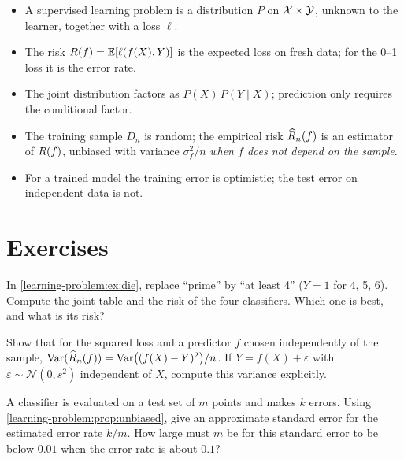 \begin{notechapter}
\begin{chaptersummary}
\begin{itemize}[nosep]
  \item A supervised learning problem is a distribution $P$ on
        $\mathcal{X}\times\mathcal{Y}$, unknown to the learner, together with a loss $\ell$.
  \item The risk $R(f) = \mathbb{E}[\ell(f(X),Y)]$ is the expected loss on fresh
        data; for the 0--1 loss it is the error rate.
  \item The joint distribution factors as $P(X)\,P(Y\mid X)$; prediction only
        requires the conditional factor.
  \item The training sample $D_n$ is random; the empirical risk $\widehat{R}_n(f)$ is
        an estimator of $R(f)$, unbiased with variance $\sigma_f^2/n$
        \emph{when $f$ does not depend on the sample}.
  \item For a trained model the training error is optimistic; the test error
        on independent data is not.
\end{itemize}
\end{chaptersummary}

\section*{Exercises}

\begin{exercise}\label{learning-problem:exr:1}
In \cref{learning-problem:ex:die}, replace ``prime'' by ``at least 4''
($Y=1$ for 4, 5, 6). Compute the joint table and the risk of the four
classifiers. Which one is best, and what is its risk?
\end{exercise}

\begin{exercise}\label{learning-problem:exr:2}
Show that for the squared loss and a predictor $f$ chosen independently of
the sample, $\operatorname{Var}(\widehat{R}_n(f)) = \operatorname{Var}\bigl((f(X)-Y)^2\bigr)/n$. If
$Y = f(X) + \varepsilon$ with $\varepsilon \sim \mathcal N(0, s^2)$
independent of $X$, compute this variance explicitly.
\end{exercise}

\begin{exercise}\label{learning-problem:exr:3}
A classifier is evaluated on a test set of $m$ points and makes $k$ errors.
Using \cref{learning-problem:prop:unbiased}, give an approximate standard
error for the estimated error rate $k/m$. How large must $m$ be for this
standard error to be below $0.01$ when the error rate is about $0.1$?
\end{exercise}
\end{notechapter}
